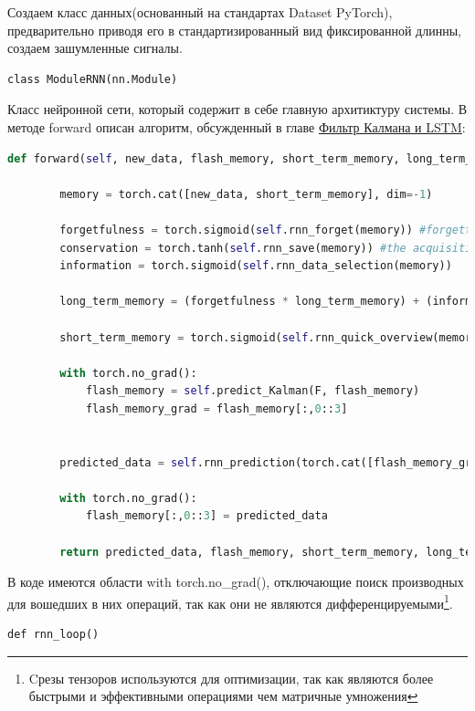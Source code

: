 \documentclass[a4paper,11pt]{article} %
\begin{document}
Создаем класс данных(основанный на стандартах Dataset PyTorch), предварительно  приводя его в стандартизированный вид фиксированной длинны, создаем зашумленные сигналы.

\begin{lstlisting}
class ModuleRNN(nn.Module)
\end{lstlisting}
Класс нейронной сети, который содержит в себе главную архитиктуру системы. В методе forward описан алгоритм, обсужденный в главе \hyperref[RNNfilter]{Фильтр Калмана и LSTM}:

\begin{lstlisting}[label=some-code,caption=ModuleRNN.forward(), language=Python]
def forward(self, new_data, flash_memory, short_term_memory, long_term_memory, F):

        memory = torch.cat([new_data, short_term_memory], dim=-1)

        forgetfulness = torch.sigmoid(self.rnn_forget(memory)) #forgetting dataforgetting data
        conservation = torch.tanh(self.rnn_save(memory)) #the acquisition of new data
        information = torch.sigmoid(self.rnn_data_selection(memory))

        long_term_memory = (forgetfulness * long_term_memory) + (information * conservation)

        short_term_memory = torch.sigmoid(self.rnn_quick_overview(memory)) * torch.tanh(long_term_memory)
        
        with torch.no_grad():
            flash_memory = self.predict_Kalman(F, flash_memory)
            flash_memory_grad = flash_memory[:,0::3]


        predicted_data = self.rnn_prediction(torch.cat([flash_memory_grad, short_term_memory], dim=-1))

        with torch.no_grad(): 
            flash_memory[:,0::3] = predicted_data

        return predicted_data, flash_memory, short_term_memory, long_term_memory
\end{lstlisting}

В коде имеются области with torch.no\_grad(), отключающие поиск производных для вошедших в них операций, так как они не являются дифференцируемыми\footnote{Cрезы тензоров используются для оптимизации, так как являются более быстрыми и эффективными операциями чем  матричные умножения}.

\begin{lstlisting}
def rnn_loop()
\end{lstlisting}
\end{document}
